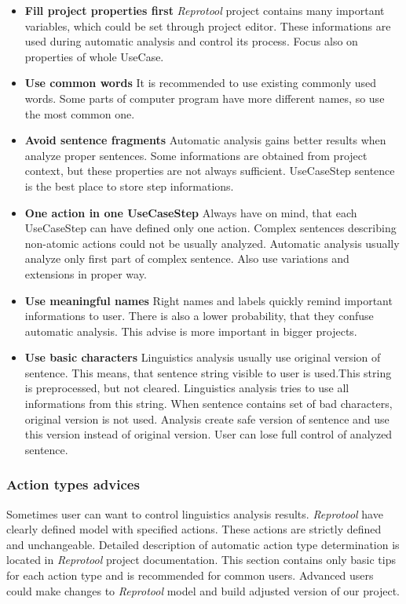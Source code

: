 \begin{itemize}
\item {\bf Fill project properties first} \emph{Reprotool} project contains many important variables, which could be set through project editor. These informations are used during automatic analysis and control its process. Focus also on properties of whole UseCase.

\item {\bf Use common words} It is recommended to use existing commonly used words. Some parts of computer program have more different names, so use the most common one.

\item {\bf Avoid sentence fragments} Automatic analysis gains better results when analyze proper sentences. Some informations are obtained from project context, but these properties are not always sufficient. UseCaseStep sentence is the best place to store step informations.

\item {\bf One action in one UseCaseStep} Always have on mind, that each UseCaseStep can have defined only one action. Complex sentences describing non-atomic actions could not be usually analyzed. Automatic analysis usually analyze only first part of complex sentence. Also use variations and extensions in proper way.

\item {\bf Use meaningful names} Right names and labels quickly remind important informations to user. There is also a lower probability, that they confuse automatic analysis. This advise is more important in bigger projects.

\item {\bf Use basic characters} Linguistics analysis usually use original version of sentence. This means, that sentence string visible to user is used.This string is preprocessed, but not cleared. Linguistics analysis tries to use all informations from this string. When sentence contains set of bad characters, original version is not used. Analysis create safe version of sentence and use this version instead of original version. User can lose full control of analyzed sentence. 
\end{itemize}

\subsubsection{Action types advices}
Sometimes user can want to control linguistics analysis results. \emph{Reprotool} have clearly defined model with specified actions. These actions are strictly defined and unchangeable. Detailed description of automatic action type determination is located in \emph{Reprotool} project documentation.
This section contains only basic tips for each action type and is recommended for common users. Advanced users could make changes to \emph{Reprotool} model and build adjusted version of our project.

